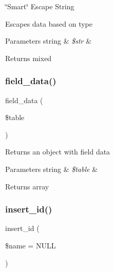 \char`\"{}\+Smart\char`\"{} Escape String

Escapes data based on type


\begin{DoxyParams}[1]{Parameters}
string & {\em \$str} & \\
\hline
\end{DoxyParams}
\begin{DoxyReturn}{Returns}
mixed 
\end{DoxyReturn}
\mbox{\label{class_c_i___d_b__pdo__pgsql__driver_a90355121e1ed009e0efdbd544ab56efa}} 
\subsubsection{\texorpdfstring{field\+\_\+data()}{field\_data()}}
{\footnotesize\ttfamily field\+\_\+data (\begin{DoxyParamCaption}\item[{}]{\$table }\end{DoxyParamCaption})}

Returns an object with field data


\begin{DoxyParams}[1]{Parameters}
string & {\em \$table} & \\
\hline
\end{DoxyParams}
\begin{DoxyReturn}{Returns}
array 
\end{DoxyReturn}
\mbox{\label{class_c_i___d_b__pdo__pgsql__driver_ae61dc2c85e5516f143f6246c686bc3fc}} 
\subsubsection{\texorpdfstring{insert\+\_\+id()}{insert\_id()}}
{\footnotesize\ttfamily insert\+\_\+id (\begin{DoxyParamCaption}\item[{}]{\$name = {\ttfamily NULL} }\end{DoxyParamCaption})}

